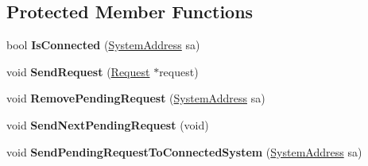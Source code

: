 \subsection*{Protected Member Functions}
\begin{DoxyCompactItemize}
\item 
\hypertarget{class_rak_net_1_1_h_t_t_p_connection2_a58898a1ee4333dab5fd2c1910be422d5}{bool {\bfseries Is\-Connected} (\hyperlink{struct_rak_net_1_1_system_address}{System\-Address} sa)}\label{class_rak_net_1_1_h_t_t_p_connection2_a58898a1ee4333dab5fd2c1910be422d5}

\item 
\hypertarget{class_rak_net_1_1_h_t_t_p_connection2_a376f448c3b9b95a8aa01658d8b48a9c5}{void {\bfseries Send\-Request} (\hyperlink{struct_rak_net_1_1_h_t_t_p_connection2_1_1_request}{Request} $\ast$request)}\label{class_rak_net_1_1_h_t_t_p_connection2_a376f448c3b9b95a8aa01658d8b48a9c5}

\item 
\hypertarget{class_rak_net_1_1_h_t_t_p_connection2_a4739f5bb88bc21d6e621b45764abd7e6}{void {\bfseries Remove\-Pending\-Request} (\hyperlink{struct_rak_net_1_1_system_address}{System\-Address} sa)}\label{class_rak_net_1_1_h_t_t_p_connection2_a4739f5bb88bc21d6e621b45764abd7e6}

\item 
\hypertarget{class_rak_net_1_1_h_t_t_p_connection2_a174709974f06794461f0cf6644f84a65}{void {\bfseries Send\-Next\-Pending\-Request} (void)}\label{class_rak_net_1_1_h_t_t_p_connection2_a174709974f06794461f0cf6644f84a65}

\item 
\hypertarget{class_rak_net_1_1_h_t_t_p_connection2_aeef89fc6b9dc538b6e5e7fd9631f5026}{void {\bfseries Send\-Pending\-Request\-To\-Connected\-System} (\hyperlink{struct_rak_net_1_1_system_address}{System\-Address} sa)}\label{class_rak_net_1_1_h_t_t_p_connection2_aeef89fc6b9dc538b6e5e7fd9631f5026}

\end{DoxyCompactItemize}

